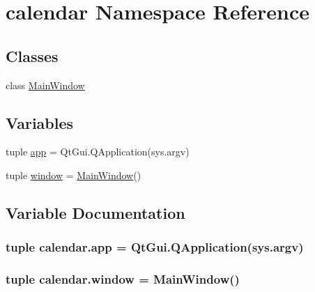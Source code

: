 \hypertarget{namespacecalendar}{}\section{calendar Namespace Reference}
\label{namespacecalendar}
\subsection*{Classes}
\begin{DoxyCompactItemize}
\item 
class \hyperlink{classcalendar_1_1MainWindow}{Main\+Window}
\end{DoxyCompactItemize}
\subsection*{Variables}
\begin{DoxyCompactItemize}
\item 
tuple \hyperlink{namespacecalendar_ad09cd62e9c8eceefd61443b73b9fa5e8}{app} = Qt\+Gui.\+Q\+Application(sys.\+argv)
\item 
tuple \hyperlink{namespacecalendar_ac008c89359295d7d8c105ba801c96418}{window} = \hyperlink{classcalendar_1_1MainWindow}{Main\+Window}()
\end{DoxyCompactItemize}


\subsection{Variable Documentation}
\hypertarget{namespacecalendar_ad09cd62e9c8eceefd61443b73b9fa5e8}{}
\subsubsection[{app}]{\setlength{\rightskip}{0pt plus 5cm}tuple calendar.\+app = Qt\+Gui.\+Q\+Application(sys.\+argv)}\label{namespacecalendar_ad09cd62e9c8eceefd61443b73b9fa5e8}
\hypertarget{namespacecalendar_ac008c89359295d7d8c105ba801c96418}{}
\subsubsection[{window}]{\setlength{\rightskip}{0pt plus 5cm}tuple calendar.\+window = {\bf Main\+Window}()}\label{namespacecalendar_ac008c89359295d7d8c105ba801c96418}
